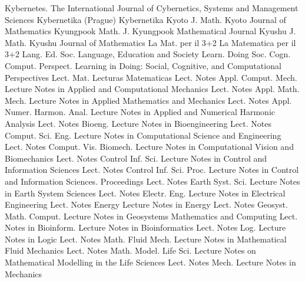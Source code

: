 {Kybernetes. The International Journal of Cybernetics, Systems and Management Sciences}
{Kybernetika (Prague)}
{Kybernetika}
{Kyoto J. Math.}
{Kyoto Journal of Mathematics}
{Kyungpook Math. J.}
{Kyungpook Mathematical Journal}
{Kyushu J. Math.}
{Kyushu Journal of Mathematics}
{La Mat. per il 3+2}
{La Matematica per il 3+2}
{Lang. Ed. Soc.}
{Language, Education and Society}
{Learn. Doing Soc. Cogn. Comput. Perspect.}
{Learning in Doing: Social, Cognitive, and Computational Perspectives}
{Lect. Mat.}
{Lecturas Matematicas}
{Lect. Notes Appl. Comput. Mech.}
{Lecture Notes in Applied and Computational Mechanics}
{Lect. Notes Appl. Math. Mech.}
{Lecture Notes in Applied Mathematics and Mechanics}
{Lect. Notes Appl. Numer. Harmon. Anal.}
{Lecture Notes in Applied and Numerical Harmonic Analysis}
{Lect. Notes Bioeng.}
{Lecture Notes in Bioengineering}
{Lect. Notes Comput. Sci. Eng.}
{Lecture Notes in Computational Science and Engineering}
{Lect. Notes Comput. Vis. Biomech.}
{Lecture Notes in Computational Vision and Biomechanics}
{Lect. Notes Control Inf. Sci.}
{Lecture Notes in Control and Information Sciences}
{Lect. Notes Control Inf. Sci. Proc.}
{Lecture Notes in Control and Information Sciences. Proceedings}
{Lect. Notes Earth Syst. Sci.}
{Lecture Notes in Earth System Sciences}
{Lect. Notes Electr. Eng.}
{Lecture Notes in Electrical Engineering}
{Lect. Notes Energy}
{Lecture Notes in Energy}
{Lect. Notes Geosyst. Math. Comput.}
{Lecture Notes in Geosystems Mathematics and Computing}
{Lect. Notes in Bioinform.}
{Lecture Notes in Bioinformatics}
{Lect. Notes Log.}
{Lecture Notes in Logic}
{Lect. Notes Math. Fluid Mech.}
{Lecture Notes in Mathematical Fluid Mechanics}
{Lect. Notes Math. Model. Life Sci.}
{Lecture Notes on Mathematical Modelling in the Life Sciences}
{Lect. Notes Mech.}
{Lecture Notes in Mechanics}
